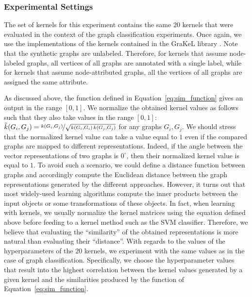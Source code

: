 \documentclass[twoside,11pt]{article}
\begin{document}
\subsubsection{Experimental Settings}
The set of kernels for this experiment contains the same $20$ kernels that were evaluated in the context of the graph classification experiments.
Once again, we use the implementations of the kernels contained in the GraKeL library .
Note that the synthetic graphs are unlabeled.
Therefore, for kernels that assume node-labeled graphs, all vertices of all graphs are annotated with a single label, while for kernels that assume node-attributed graphs, all the vertices of all graphs are assigned the same attribute.

As discussed above, the function defined in Equation~\eqref{eq:sim_function} gives an output in the range $[0, 1]$.
We normalize the obtained kernel values as follows such that they also take values in the range $[0,1]$: $\hat{k}(G_i, G_j) = \nicefrac{k(G_i,G_j)}{\sqrt{k(G_i, G_i) \, k(G_j, G_j)}}$ for any graphs $G_i, G_j$.
We should stress that the normalized kernel value can take a value equal to $1$ even if the compared graphs are mapped to different representations.
Indeed, if the angle between the vector representations of two graphs is $0^\circ$, then their normalized kernel value is equal to $1$.
To avoid such a scenario, we could define a distance function between graphs and accordingly compute the Euclidean distance between the graph representations generated by the different approaches.
However, it turns out that most widely-used learning algorithms compute the inner products between the input objects or some transformations of these objects. 
In fact, when learning with kernels, we usually normalize the kernel matrices using the equation defined above before feeding to a kernel method such as the SVM classifier.
Therefore, we believe that evaluating the ``similarity'' of the obtained representations is more natural than evaluating their ``distance''.
With regards to the values of the hyperparameters of the $20$ kernels, we experiment with the same values as in the case of graph classification.
Specifically, we choose the hyperparameter values that result into the highest correlation between the kernel values generated by a given kernel and the similarities produced by the function of Equation~\eqref{eq:sim_function}.
\end{document}
